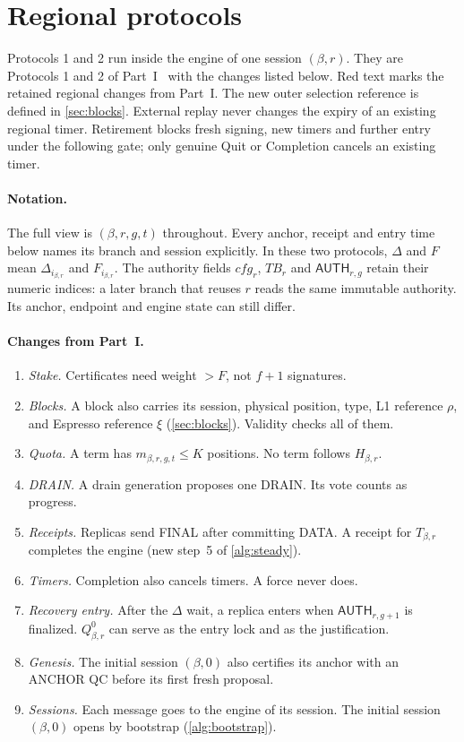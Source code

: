 \documentclass[11pt,a4paper]{article}
\newcommand{\RR}[1]{{\color{rrRed}#1}}
\newcommand{\TB}{\mathit{TB}}
\newcommand{\tagg}[1]{\ensuremath{\mathsf{#1}}}
\newcounter{protocol}
\begin{document}
\section{Regional protocols}
\label{sec:protocols}
Protocols 1 and 2 run inside the engine of one session $(\beta,r)$. They are
Protocols 1 and 2 of Part~I~\cite{part1} with the changes listed below.
\RR{Red text} marks the retained regional changes from Part~I.
The new outer selection reference is defined in \cref{sec:blocks}.
External replay never changes the expiry of an existing regional timer.
Retirement blocks fresh signing, new timers and further entry under the
following gate; only genuine Quit or Completion cancels an existing timer.

\paragraph{Notation.}
The full view is $(\beta,r,g,t)$ throughout. Every anchor, receipt and
entry time below names its branch and session explicitly. In these two
protocols, $\Delta$ and $F$ mean $\Delta_{i_{\beta,r}}$ and
$F_{i_{\beta,r}}$. The authority fields $\mathit{cfg}_r$, $\TB_r$ and
$\tagg{AUTH}_{r,g}$ retain their numeric indices: a later branch that
reuses $r$ reads the same immutable authority. Its anchor, endpoint and
engine state can still differ.

\paragraph{Changes from Part~I.}
\begin{enumerate}[label=\arabic*.]
\item \emph{Stake.} Certificates need weight $>F$, not $f+1$ signatures.
\item \emph{Blocks.} A block also carries its session, physical
position, type, L1 reference $\rho$, and Espresso reference $\xi$
(\cref{sec:blocks}). Validity
checks all of them.
\item \emph{Quota.} A term has $m_{\beta,r,g,t}\le K$ positions. No term follows
$H_{\beta,r}$.
\item \emph{DRAIN.} A drain generation proposes one DRAIN. Its vote
counts as progress.
\item \emph{Receipts.} Replicas send FINAL after committing DATA. A
receipt for $T_{\beta,r}$ completes the engine (new step~5 of \cref{alg:steady}).
\item \emph{Timers.} Completion also cancels timers. A force never does.
\item \emph{Recovery entry.} After the $\Delta$ wait, a replica enters
when $\tagg{AUTH}_{r,g+1}$ is finalized. $Q_{\beta,r}^0$ can serve as the entry
lock and as the justification.
\item \emph{Genesis.} The initial session $(\beta,0)$ also certifies its anchor with an
ANCHOR QC before its first fresh proposal.
\item \emph{Sessions.} Each message goes to the engine of its session.
The initial session $(\beta,0)$ opens by bootstrap (\cref{alg:bootstrap}).
\end{enumerate}
\end{document}
